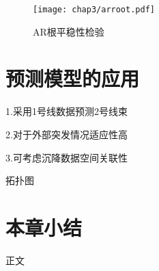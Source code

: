 \begin{figure}[htb!]
    \centering
    \texttt{[image: chap3/arroot.pdf]}
    \caption{AR根平稳性检验}
    \label{fig:AR根平稳性检验}
\end{figure}

\section{预测模型的应用}

1.采用1号线数据预测2号线束

2.对于外部突发情况适应性高

3.可考虑沉降数据空间关联性

拓扑图

\section{本章小结}

正文